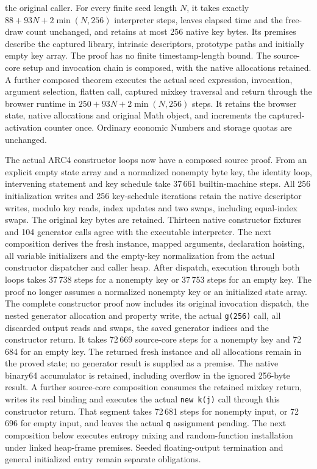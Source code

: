 \documentclass[11pt,a4paper]{article}
\numberwithin{equation}{section}
\theoremstyle{definition}
\theoremstyle{remark}
\begin{document}
the original caller. For every finite seed length $N$, it takes exactly $88+93N+2\min(N,256)$ interpreter steps, leaves elapsed time and the free-draw count unchanged, and retains at most 256 native key bytes. Its premises describe the captured library, intrinsic descriptors, prototype paths and initially empty key array. The proof has no finite timestamp-length bound. The source-core setup and invocation chain is composed, with the native allocations retained. A further composed theorem executes the actual seed expression, invocation, argument selection, flatten call, captured mixkey traversal and return through the browser runtime in $250+93N+2\min(N,256)$ steps. It retains the browser state, native allocations and original Math object, and increments the captured-activation counter once. Ordinary economic Numbers and storage quotas are unchanged.

The actual ARC4 constructor loops now have a composed source proof. From an explicit empty state array and a normalized nonempty byte key, the identity loop, intervening statement and key schedule take 37\,661 builtin-machine steps. All 256 initialization writes and 256 key-schedule iterations retain the native descriptor writes, modulo key reads, index updates and two swaps, including equal-index swaps. The original key bytes are retained. Thirteen native constructor fixtures and 104 generator calls agree with the executable interpreter. The next composition derives the fresh instance, mapped arguments, declaration hoisting, all variable initializers and the empty-key normalization from the actual constructor dispatcher and caller heap. After dispatch, execution through both loops takes 37\,738 steps for a nonempty key or 37\,753 steps for an empty key. The proof no longer assumes a normalized nonempty key or an initialized state array. The complete constructor proof now includes its original invocation dispatch, the nested generator allocation and property write, the actual \texttt{g(256)} call, all discarded output reads and swaps, the saved generator indices and the constructor return. It takes 72\,669 source-core steps for a nonempty key and 72\,684 for an empty key. The returned fresh instance and all allocations remain in the proved state; no generator result is supplied as a premise. The native binary64 accumulator is retained, including overflow in the ignored 256-byte result. A further source-core composition consumes the retained mixkey return, writes its real binding and executes the actual \texttt{new k(j)} call through this constructor return. That segment takes 72\,681 steps for nonempty input, or 72\,696 for empty input, and leaves the actual \texttt{q} assignment pending. The next composition below executes entropy mixing and random-function installation under linked heap-frame premises. Seeded floating-output termination and general initialized entry remain separate obligations.
\end{document}
